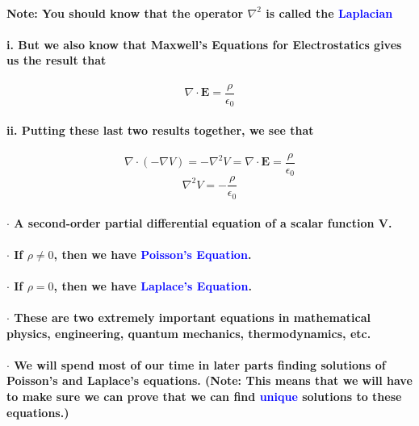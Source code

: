\documentclass{article}
\begin{document}
\paragraph{Note: You should know that the operator $\nabla^2$ is called the \textcolor{blue}{Laplacian}}
\indent \paragraph{i. But we also know that Maxwell's Equations for Electrostatics gives us the result that}
\begin{equation*}
    \nabla \cdot \boldsymbol{E}=\frac{\rho}{\epsilon_0}
\end{equation*}
\indent \paragraph{ii. Putting these last two results together, we see that}
\begin{equation*}
    \nabla \cdot (-\nabla V)=-\nabla^2V=\nabla \cdot \boldsymbol{E}=\frac{\rho}{\epsilon_0}
\end{equation*}
\begin{equation*}
    \nabla^2 V=-\frac{\rho}{\epsilon_0}
\end{equation*}
\paragraph{\indent $\cdot$ A second-order partial differential equation of a scalar function V.}
\paragraph{\indent $\cdot$ If $\rho \neq 0$, then we have \textcolor{blue}{Poisson's Equation}.}
\paragraph{\indent $\cdot$ If $\rho = 0$, then we have \textcolor{blue}{Laplace's Equation}.}
\paragraph{\indent $\cdot$ These are two extremely important equations in mathematical physics, engineering, quantum mechanics, thermodynamics, etc.}
\paragraph{\indent $\cdot$ We will spend most of our time in later parts finding solutions of Poisson's and Laplace's equations. (Note: This means that we will have to make sure we can prove that we can find \textcolor{blue}{unique} solutions to these equations.)}
\pagebreak
\end{document}
